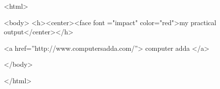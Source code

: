 <html>

<body>
<h><center><face font ="impact" color="red">my practical output</center></h>

<a href=”http://www.computersadda.com/”> computer adda </a>

</body>

</html>